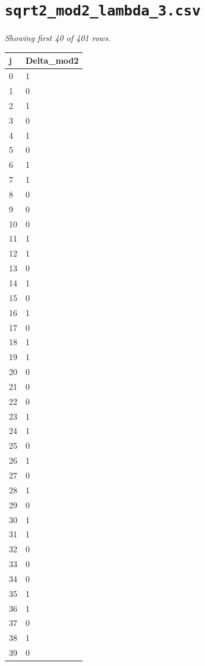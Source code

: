 \documentclass[10pt]{article}
\begin{document}
\section*{\texttt{sqrt2\_mod2\_lambda\_3.csv}}
\noindent\textit{Showing first 40 of 401 rows.}\par\medskip
{\footnotesize
\begin{longtable}{@{}ll@{}}
\toprule
\textbf{j} & \textbf{Delta\_mod2} \\
\midrule\endhead
0 & 1 \\
1 & 0 \\
2 & 1 \\
3 & 0 \\
4 & 1 \\
5 & 0 \\
6 & 1 \\
7 & 1 \\
8 & 0 \\
9 & 0 \\
10 & 0 \\
11 & 1 \\
12 & 1 \\
13 & 0 \\
14 & 1 \\
15 & 0 \\
16 & 1 \\
17 & 0 \\
18 & 1 \\
19 & 1 \\
20 & 0 \\
21 & 0 \\
22 & 0 \\
23 & 1 \\
24 & 1 \\
25 & 0 \\
26 & 1 \\
27 & 0 \\
28 & 1 \\
29 & 0 \\
30 & 1 \\
31 & 1 \\
32 & 0 \\
33 & 0 \\
34 & 0 \\
35 & 1 \\
36 & 1 \\
37 & 0 \\
38 & 1 \\
39 & 0 \\
\bottomrule
\end{longtable}}
\end{document}
